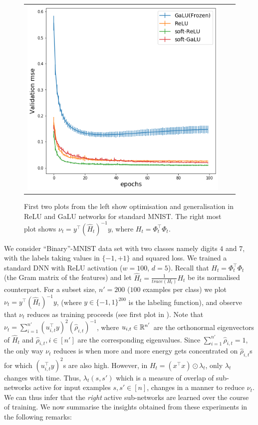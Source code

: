 \begin{figure}
{\begin{tabular}{ccc}
\includegraphics[scale=0.1]{figs/allnet-gen.png}
\end{tabular}
}
\caption{First two plots from the left show optimisation and generalisation in ReLU and GaLU networks for standard MNIST. The right most plot shows $\nu_t=y^\top (\widehat{H}_t)^{-1}y$, where $H_t=\Phi_t^\top \Phi_t$.}
\label{fig:gen}
\end{figure}
We consider ``Binary''-MNIST data set with two classes namely digits $4$ and $7$, with the labels taking values in $\{-1,+1\}$ and squared loss. We trained a standard DNN with ReLU activation ($w=100$, $d=5$). Recall that $H_t=\Phi^\top_t\Phi_t$  (the Gram matrix of the features) and let $\widehat{H}_t=\frac{1}{trace(H_t)}H_t$ be its normalised counterpart. For a subset size, $n'=200$ ($100$ examples per class) we plot $\nu_t=y^\top (\widehat{H}_t)^{-1} y$, (where $y\in\{-1,1\}^{200}$ is the labeling function), and observe that $\nu_t$ reduces as training proceeds (see first plot in ). Note that $\nu_t=\sum_{i=1}^{n'}(u_{i,t}^\top y)^2 (\hat{\rho}_{i,t})^{-1}$, where $u_{i,t}\in \mathbb{R}^{n'}$ are the orthonormal eigenvectors of $\widehat{H}_t$ and $\hat{\rho}_{i,t},i\in[n']$ are the corresponding eigenvalues. Since $\sum_{i=1}^{n'}\hat{\rho}_{i,t}=1$, the only way $\nu_t$ reduces is when more and more energy gets concentrated on $\hat{\rho}_{i,t}$s for which $(u_{i,t}^\top y)^2$s are also high. However, in $H_t=(x^\top x)\odot \lambda_t$, only $\lambda_t$ changes with time. Thus, $\lambda_t(s,s')$ which is a measure of overlap of sub-networks active for input examples $s,s'\in[n]$, changes in a manner to reduce $\nu_t$. We can thus infer that the \emph{right} active sub-networks are learned over the course of training. We now summarise the insights obtained from these experiments in the following remarks:\hfill\\

